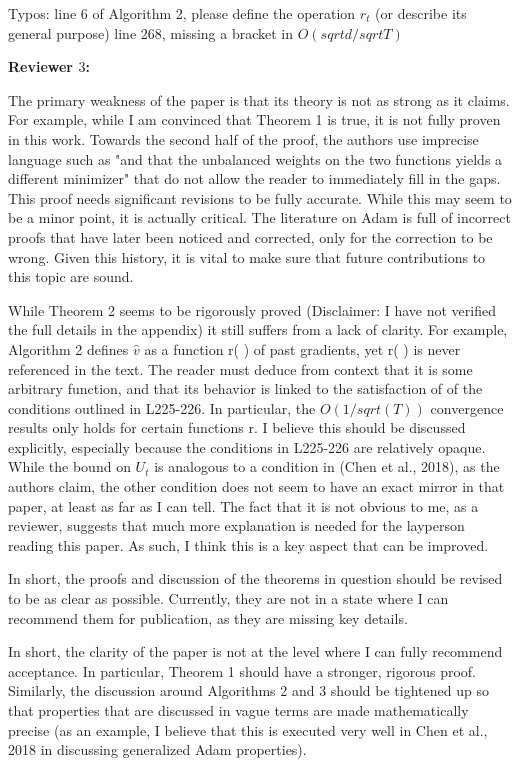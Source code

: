 \documentclass{article}
\begin{document}
Typos:
line 6 of Algorithm 2, please define the operation $r_t$ (or describe its general purpose)
line 268, missing a bracket in $O(sqrt{d}/ sqrt{T})$

\textbf{Reviewer $3$:}

The primary weakness of the paper is that its theory is not as strong as it claims. For example, while I am convinced that Theorem 1 is true, it is not fully proven in this work. Towards the second half of the proof, the authors use imprecise language such as "and that the unbalanced weights on the two functions yields a different minimizer" that do not allow the reader to immediately fill in the gaps. This proof needs significant revisions to be fully accurate. While this may seem to be a minor point, it is actually critical. The literature on Adam is full of incorrect proofs that have later been noticed and corrected, only for the correction to be wrong. Given this history, it is vital to make sure that future contributions to this topic are sound.

While Theorem 2 seems to be rigorously proved (Disclaimer: I have not verified the full details in the appendix) it still suffers from a lack of clarity. For example, Algorithm 2 defines $\hat{v}$ as a function r( ) of past gradients, yet r( ) is never referenced in the text. The reader must deduce from context that it is some arbitrary function, and that its behavior is linked to the satisfaction of of the conditions outlined in L225-226. In particular, the $O(1/sqrt(T))$ convergence results only holds for certain functions r. I believe this should be discussed explicitly, especially because the conditions in L225-226 are relatively opaque. While the bound on $U_t$ is analogous to a condition in (Chen et al., 2018), as the authors claim, the other condition does not seem to have an exact mirror in that paper, at least as far as I can tell. The fact that it is not obvious to me, as a reviewer, suggests that much more explanation is needed for the layperson reading this paper. As such, I think this is a key aspect that can be improved.

In short, the proofs and discussion of the theorems in question should be revised to be as clear as possible. Currently, they are not in a state where I can recommend them for publication, as they are missing key details.

In short, the clarity of the paper is not at the level where I can fully recommend acceptance. In particular, Theorem 1 should have a stronger, rigorous proof. Similarly, the discussion around Algorithms 2 and 3 should be tightened up so that properties that are discussed in vague terms are made mathematically precise (as an example, I believe that this is executed very well in Chen et al., 2018 in discussing generalized Adam properties).
\end{document}
